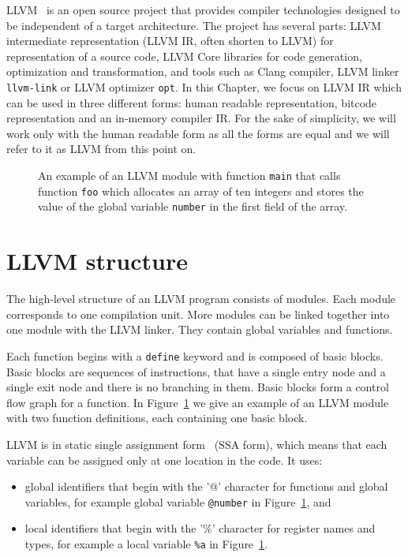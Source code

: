 LLVM~\cite{llvm} is an open source project that provides compiler technologies
designed to be independent of a target architecture. The project has several
parts: LLVM intermediate representation (LLVM IR, often shorten to LLVM) for
representation of a source code, LLVM Core libraries for code generation,
optimization and transformation, and tools such as Clang compiler, LLVM linker
\texttt{llvm-link} or LLVM optimizer \texttt{opt}. In this Chapter, we focus on
LLVM IR which can be used in three different forms: human readable
representation, bitcode representation and an in-memory compiler IR. For the
sake of simplicity, we will work only with the human readable form as all the
forms are equal and we will refer to it as LLVM from this point on.

\begin{figure}[h]
 
 \caption{An example of an LLVM module with function \texttt{main} that calls
 function \texttt{foo} which allocates an array of ten integers and stores the
 value of the global variable \texttt{number} in the first field of the array.}
 \label{fig:llvm_example}
\end{figure}

\section{LLVM structure} %

The high-level structure of an LLVM program consists of modules. Each module
corresponds to one compilation unit. More modules can be linked together into
one module with the LLVM linker. They contain global variables and functions.

Each function begins with a \texttt{define} keyword and is composed of basic
blocks. Basic blocks are sequences of instructions, that have a single entry node
and a single exit node and there is no branching in them. Basic blocks form
a control flow graph for a function. In Figure~\ref{fig:llvm_example} we give
an example of an LLVM module with two function definitions, each containing one
basic block.

LLVM is in static single assignment form~\cite{ssa} (SSA form), which means that each
variable can be assigned only at one location in the code. It uses:

\begin{itemize}
    \item global identifiers that begin with the '@' character for functions
    and global variables, for example global variable \texttt{@number} in
    Figure~\ref{fig:llvm_example}, and
    \item local identifiers that begin with the '\%' character for register
    names and types, for example a local variable \texttt{\%a} in
    Figure~\ref{fig:llvm_example}.
\end{itemize}

